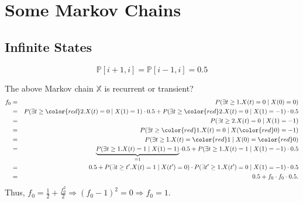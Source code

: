 \section{Some Markov Chains}

\subsection{Infinite States} \label{subsec:infinite-states}

\begin{figure}[htp]
\centering
{}
\[ \mathbb{P}[i + 1, i] = \mathbb{P}[i - 1, i] = 0.5 \]
\end{figure}

\begin{question}
The above Markov chain $ \mathbb{X} $ is recurrent or transient?
\begin{eqnarray*}
f_{0}
  & = & P(\exists t \ge 1 . X(t) = 0 \mid X(0) = 0) \\
  & = & P(\exists t \ge {\color{red} 2} . X(t) = 0 \mid X(1) = 1) \cdot 0.5
        + P(\exists t \ge {\color{red} 2} . X(t) = 0 \mid X(1) = -1) \cdot 0.5 \\
  & = & P(\exists t \ge 2 . X(t) = 0 \mid X(1) = -1) \\
  & = & P(\exists t \ge {\color{red} 1} . X(t) = 0 \mid X({\color{red} 0}) = -1) \\
  & = & P(\exists t \ge 1 . X(t) = {\color{red} 1} \mid X(0) = {\color{red} 0}) \\
  & = & \underbrace{P(\exists t \ge 1 . X(t) = 1 \mid X(1) = 1)}_{= 1} \cdot 0.5
        + P(\exists t \ge 1 . X(t) = 1 \mid X(1) = -1) \cdot 0.5 \\
  & = & 0.5 + P(\exists t \ge t' . X(t) = 1 \mid X(t') = 0) \cdot P(\exists t' \ge 1 . X(t') = 0 \mid X(1) = -1) \cdot 0.5 \\
  & = & 0.5 + f_{0} \cdot f_{0} \cdot 0.5.
\end{eqnarray*}
Thus, $ f_{0} = \frac{1}{2} + \frac{f_{0}^{2}}{2} \Rightarrow (f_{0} - 1)^{2} = 0 \Rightarrow f_{0} = 1 $.
\end{question}

